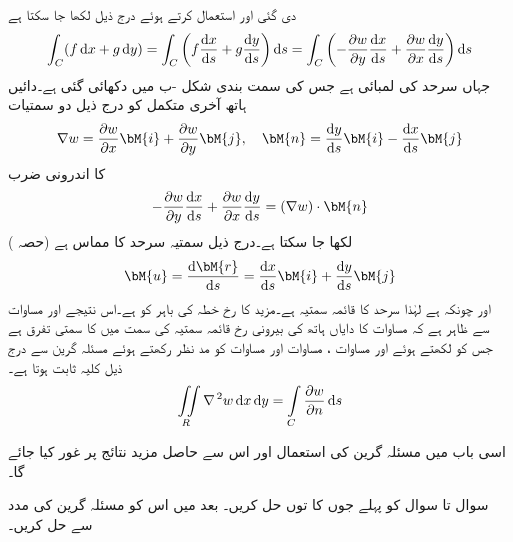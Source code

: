 دی گئی  اور  استعمال کرتے ہوئے  درج ذیل لکھا جا سکتا ہے
\begin{align}\label{مساوات_خطی_تکمل_لاپلاسی_کا_دوہرا_ب}
\int_C(f\dif x+g\dif y)=\int_C\left(f\frac{\dif x}{\dif s}+g\frac{\dif y}{\dif s}\right)\dif s=\int_C\left(-\frac{\partial w}{\partial y}\frac{\dif x}{\dif s}+\frac{\partial w}{\partial x}\frac{\dif y}{\dif s}\right)\dif s
\end{align}
جہاں  سرحد  کی لمبائی ہے جس کی سمت بندی شکل -ب میں دکھائی گئی ہے۔دائیں ہاتھ آخری متکمل کو درج ذیل دو سمتیات
\begin{align*}
\nabla w=\frac{\partial w}{\partial x}\bM{i}+\frac{\partial w}{\partial y}\bM{j}, \quad \bM{n}=\frac{\dif y}{\dif s}\bM{i}-\frac{\dif x}{\dif s}\bM{j}
\end{align*} 
 کا اندرونی ضرب
\begin{align}\label{مساوات_خطی_تکمل_سمتی_تفرق_الف}
-\frac{\partial w}{\partial y}\frac{\dif x}{\dif s}+\frac{\partial w}{\partial x}\frac{\dif y}{\dif s}=\left(\nabla w\right)\cdot \bM{n}
\end{align}
لکھا جا سکتا ہے۔درج ذیل سمتیہ  سرحد  کا مماس ہے (حصہ ) 
\begin{align*}
\bM{u}=\frac{\dif \bM{r}}{\dif s}=\frac{\dif x}{\dif s}\bM{i}+\frac{\dif y}{\dif s}\bM{j}
\end{align*}
اور چونکہ  ہے لہٰذا  سرحد  کا قائمہ سمتیہ ہے۔مزید  کا رخ خطہ  کی باہر کو ہے۔اس نتیجے اور مساوات  سے ظاہر ہے کہ مساوات  کا دایاں ہاتھ  کی بیرونی رخ قائمہ سمتیہ  کی سمت میں  کا سمتی تفرق ہے  جس کو  لکھتے ہوئے اور مساوات ، مساوات  اور مساوات  کو مد نظر رکھتے ہوئے مسئلہ گرین سے درج ذیل کلیہ ثابت ہوتا ہے۔
\begin{align}\label{مساوات_خطی_تکمل_لاپلاسی_قائمہ_تبادل}
\iint\limits_R \nabla^{\,2} w\dif x\dif y=\int\limits_C \frac{\partial w}{\partial n} \dif s
\end{align}

اسی باب میں مسئلہ گرین کی استعمال اور اس سے حاصل مزید نتائج پر غور کیا جائے گا۔

سوال  تا سوال  کو پہلے  جوں کا توں حل کریں۔ بعد میں اس کو مسئلہ گرین کی مدد سے حل کریں۔

